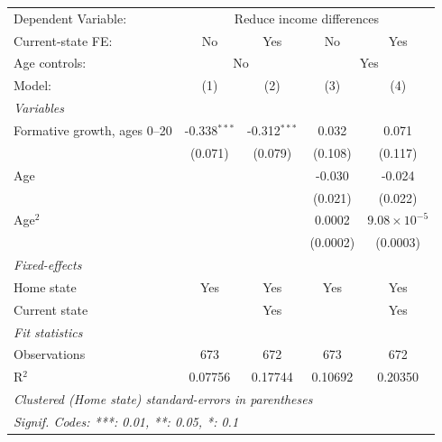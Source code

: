   \begin{tabular}{lcccc}
      \tabularnewline \midrule \midrule
      Dependent Variable: & \multicolumn{4}{c}{Reduce income differences}\\
      Current-state FE:            & No             & Yes            & No       & Yes \\   
      Age controls: & \multicolumn{2}{c}{No} & \multicolumn{2}{c}{Yes} \\ 
      Model:                       & (1)            & (2)            & (3)      & (4)\\  
      \midrule
      \emph{Variables}\\
      Formative growth, ages 0--20 & -0.338$^{***}$ & -0.312$^{***}$ & 0.032    & 0.071\\   
                                   & (0.071)        & (0.079)        & (0.108)  & (0.117)\\   
      Age                          &                &                & -0.030   & -0.024\\   
                                   &                &                & (0.021)  & (0.022)\\   
      Age$^2$                      &                &                & 0.0002   & $9.08\times 10^{-5}$\\    
                                   &                &                & (0.0002) & (0.0003)\\   
      \midrule
      \emph{Fixed-effects}\\
      Home state                   & Yes            & Yes            & Yes      & Yes\\  
      Current state                &                & Yes            &          & Yes\\  
      \midrule
      \emph{Fit statistics}\\
      Observations                 & 673            & 672            & 673      & 672\\  
      R$^2$                        & 0.07756        & 0.17744        & 0.10692  & 0.20350\\  
      \midrule \midrule
      \multicolumn{5}{l}{\emph{Clustered (Home state) standard-errors in parentheses}}\\
      \multicolumn{5}{l}{\emph{Signif. Codes: ***: 0.01, **: 0.05, *: 0.1}}\\
   \end{tabular}
\vspace{3pt}\par{}
